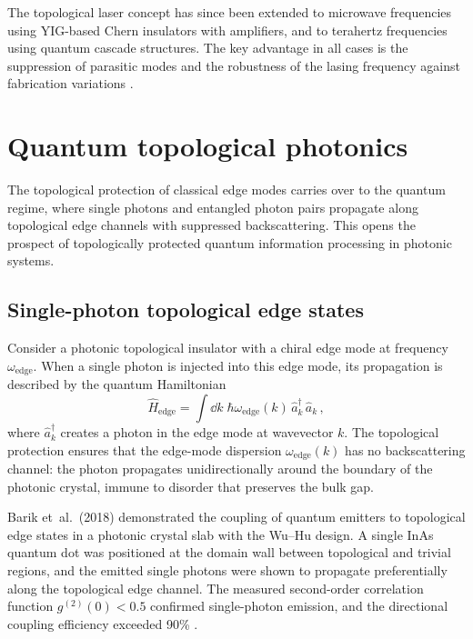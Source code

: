 The topological laser concept has since been extended to microwave
frequencies using YIG-based Chern insulators with amplifiers, and to
terahertz frequencies using quantum cascade structures.  The key
advantage in all cases is the suppression of parasitic modes and the
robustness of the lasing frequency against fabrication variations
\cite{price2022roadmap}.

\section{Quantum topological photonics}
\label{sec:ch18-quantum-topo}

The topological protection of classical edge modes carries over to
the quantum regime, where single photons and entangled photon pairs
propagate along topological edge channels with suppressed
backscattering.  This opens the prospect of topologically protected
quantum information processing in photonic systems.

\subsection{Single-photon topological edge states}
\label{sec:ch18-single-photon-edge}

Consider a photonic topological insulator with a chiral edge mode at
frequency $\omega_{\mathrm{edge}}$.  When a single photon is
injected into this edge mode, its propagation is described by the
quantum Hamiltonian
\begin{equation}\label{eq:ch18-quantum-edge-H}
  \hat{H}_{\mathrm{edge}}
  = \int\!\dd k\;\hbar\omega_{\mathrm{edge}}(k)\,
  \hat{a}^\dagger_k\,\hat{a}_k\,,
\end{equation}
where $\hat{a}^\dagger_k$ creates a photon in the edge mode at
wavevector $k$.  The topological protection ensures that the
edge-mode dispersion $\omega_{\mathrm{edge}}(k)$ has no backscattering
channel: the photon propagates unidirectionally around the boundary
of the photonic crystal, immune to disorder that preserves the bulk
gap.

Barik et~al.\ (2018) demonstrated the coupling of quantum emitters
to topological edge states in a photonic crystal slab with the
Wu--Hu design.  A single InAs quantum dot was positioned at the domain
wall between topological and trivial regions, and the emitted single
photons were shown to propagate preferentially along the topological
edge channel.  The measured second-order correlation function
$g^{(2)}(0)<0.5$ confirmed single-photon emission, and the
directional coupling efficiency exceeded 90\%
\cite{ozawa2018topological,noh2018observation}.

